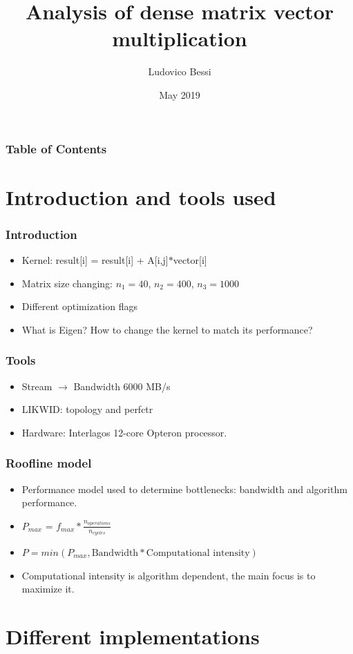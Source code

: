 \documentclass{beamer}
\title {Analysis of dense matrix vector multiplication}
\author %
{Ludovico Bessi}
\institute[VFU] %
{
  Matematica per l'ingegneria\\
  Politecnico di Torino
}
\date{May 2019}
\begin{document}
 
\frame{\titlepage}

\begin{frame}
\frametitle{Table of Contents}
\tableofcontents
\end{frame}

\section{Introduction and tools used}
\begin{frame}
\frametitle{Introduction}
\begin{itemize}
 \item<1-> Kernel: result[i] = result[i] + A[i,j]$*$vector[i]
 \item<2-> Matrix size changing: $n_1 = 40$, $n_2 = 400$, $n_3 = 1000$
 \item<3-> Different optimization flags 
 \item <4-> What is Eigen? How to change the kernel to match its performance?
\end{itemize}
\end{frame}

\begin{frame}
\frametitle{Tools}
\begin{itemize}
\item <1-> Stream $\to$ Bandwidth 6000 MB/s
\item <2-> LIKWID: topology and perfctr
\item <3-> Hardware: Interlagos 12-core Opteron processor.
\end{itemize}
\end{frame}

\begin{frame}
\frametitle{Roofline model}
\begin{itemize}
\item <1-> Performance model used to determine bottlenecks: bandwidth and algorithm performance.
\item <2-> $P_{max}$ = $f_{max} * \frac{n_{operations}}{n_{cycles}}$
\item <3-> $P = min(P_{max}, \text{Bandwidth} * \text{Computational intensity})$
\item <4-> Computational intensity is algorithm dependent, the main focus is to maximize it.
\end{itemize}
\end{frame}


\section{Different implementations}
\end{document}
